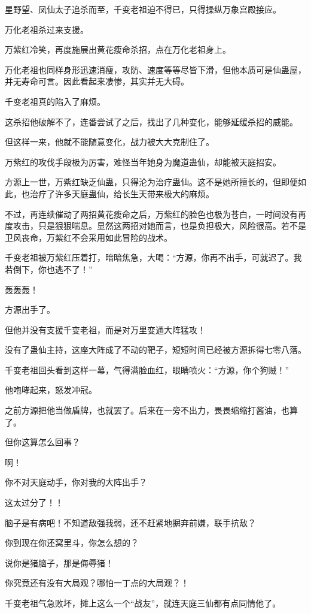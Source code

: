 \begin{this_body}
星野望、凤仙太子追杀而至，千变老祖迫不得已，只得操纵万象宫殿接应。

万化老祖杀过来支援。

万紫红冷笑，再度施展出黄花瘦命杀招，点在万化老祖身上。

万化老祖也同样身形迅速消瘦，攻防、速度等等尽皆下滑，但他本质可是仙蛊屋，并无寿命可言。因此看起来凄惨，其实并无大碍。

千变老祖真的陷入了麻烦。

这杀招他破解不了，连番尝试了之后，找出了几种变化，能够延缓杀招的威能。

但这样一来，他就不能随意变化，战力被大大克制住了。

万紫红的攻伐手段极为厉害，难怪当年她身为魔道蛊仙，却能被天庭招安。

方源上一世，万紫红缺乏仙蛊，只得沦为治疗蛊仙。这不是她所擅长的，但即便如此，也治疗了许多天庭蛊仙，给长生天带来极大的麻烦。

不过，再连续催动了两招黄花瘦命之后，万紫红的脸色也极为苍白，一时间没有再度攻击，只是狠狠喘息。显然这两招对她而言，也是负担极大，风险很高。若不是卫风丧命，万紫红不会采用如此冒险的战术。

千变老祖被万紫红压着打，暗暗焦急，大喝：“方源，你再不出手，可就迟了。我若倒下，你也逃不了！”

轰轰轰！

方源出手了。

但他并没有支援千变老祖，而是对万里变通大阵猛攻！

没有了蛊仙主持，这座大阵成了不动的靶子，短短时间已经被方源拆得七零八落。

千变老祖回头看到这样一幕，气得满脸血红，眼睛喷火：“方源，你个狗贼！”

他咆哮起来，怒发冲冠。

之前方源把他当做盾牌，也就罢了。后来在一旁不出力，畏畏缩缩打酱油，也算了。

但你这算怎么回事？

啊！

你不对天庭动手，你对我的大阵出手？

这太过分了！！

脑子是有病吧！不知道敌强我弱，还不赶紧地摒弃前嫌，联手抗敌？

你到现在你还窝里斗，你怎么想的？

说你是猪脑子，那是侮辱猪！

你究竟还有没有大局观？哪怕一丁点的大局观？！

千变老祖气急败坏，摊上这么一个“战友”，就连天庭三仙都有点同情他了。


\end{this_body}
